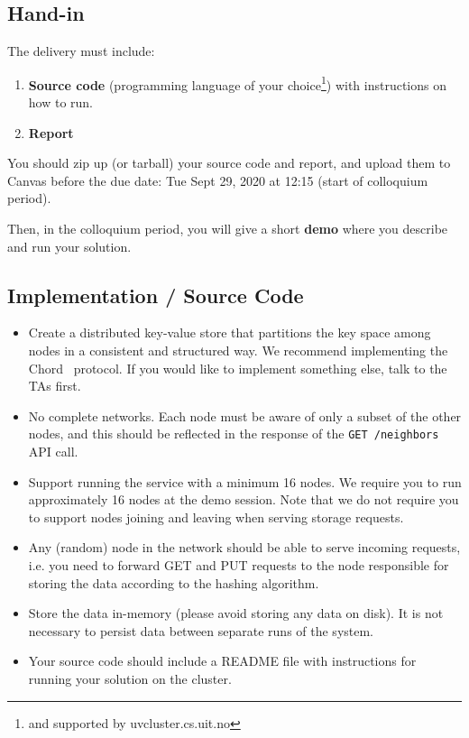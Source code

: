 \documentclass[a4paper]{article}
\def\duedate{Tue Sept 29, 2020 at 12:15 (start of colloquium period)}
\begin{document}
\subsection*{Hand-in}
The delivery must include:
\begin{enumerate}
	\item \textbf{Source code} (programming language of your choice\footnote{and supported by uvcluster.cs.uit.no}) with instructions on how to run.
	\item \textbf{Report}
\end{enumerate}

You should zip up (or tarball) your source code and report, and upload them
to Canvas before the due date: \duedate{}.

Then, in the colloquium period, you will give a short \textbf{demo}
where you describe and run your solution.

\subsection{Implementation / Source Code}

\begin{itemize}
    \item Create a distributed key-value store that partitions the key space among nodes in a consistent and structured way.
        We recommend implementing the Chord~\cite{stoica2003chord}
        protocol.
        If you would like to implement something else, talk to the TAs first.

    \item No complete networks.
        Each node must be aware of only a subset of the other nodes,
        and this should be reflected in the response of the
        \texttt{GET /neighbors} API call.

    \item Support running the service with a minimum 16 nodes. We require you to run approximately 16 nodes at the demo session. Note that we do not require you to support nodes joining and leaving when serving storage requests.

    \item Any (random) node in the network should be able to serve incoming requests, i.e. you need to forward GET and PUT requests to the node responsible for storing the data according to the hashing algorithm.

    \item Store the data in-memory (please avoid storing any data on disk).
        It is not necessary to persist data between separate runs of the system.

    \item Your source code should include a README file with instructions
        for running your solution on the cluster.

\end{itemize}
\end{document}
